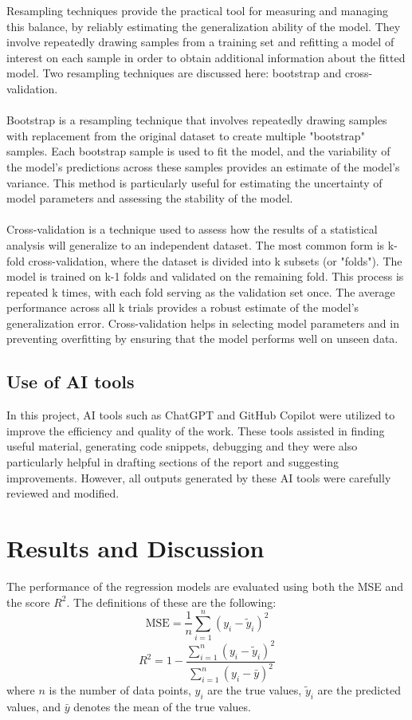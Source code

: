 \documentclass[
 reprint,            %
 amsmath,amssymb,
 aps,
]{revtex4-2}
\begin{document}
Resampling techniques provide the practical tool for measuring and managing this balance, by reliably estimating the generalization ability of the model.
They involve repeatedly drawing samples from a training set and refitting a model of interest on each sample in order to obtain additional information about the fitted model.
Two resampling techniques are discussed here: bootstrap and cross-validation.\\\\
Bootstrap is a resampling technique that involves repeatedly drawing samples with replacement from the original dataset to create multiple "bootstrap" samples\cite{hjorthjensen_week38}.
Each bootstrap sample is used to fit the model, and the variability of the model's predictions across these samples provides an estimate of the model's variance.
This method is particularly useful for estimating the uncertainty of model parameters and assessing the stability of the model.\\\\
Cross-validation is a technique used to assess how the results of a statistical analysis will generalize to an independent dataset\cite{hjorthjensen_week38}.
The most common form is k-fold cross-validation, where the dataset is divided into k subsets (or "folds").
The model is trained on k-1 folds and validated on the remaining fold.
This process is repeated k times, with each fold serving as the validation set once.
The average performance across all k trials provides a robust estimate of the model's generalization error.
Cross-validation helps in selecting model parameters and in preventing overfitting by ensuring that the model performs well on unseen data.

\subsection{Use of AI tools}
In this project, AI tools such as ChatGPT and GitHub Copilot were utilized to improve the efficiency and quality of the work. 
These tools assisted in finding useful material, generating code snippets, debugging and they were also particularly helpful in drafting sections of the report and suggesting improvements. 
However, all outputs generated by these AI tools were carefully reviewed and modified.


\section{Results and Discussion}
\label{sec:Results_and_Discussion}
The performance of the regression models are evaluated using both the MSE and the score $R^2$. The definitions of these are the following:
$$ \mathrm{MSE} = \frac{1}{n} \sum_{i=1}^{n} \left( y_i - \tilde{y}_i \right)^2$$
$$R^2 = 1 - \frac{\sum_{i=1}^{n} \left( y_i - \tilde{y}_i \right)^2}{\sum_{i=1}^{n} \left( y_i - \bar{y} \right)^2}$$
where $n$ is the number of data points, $y_i$ are the true values, $\tilde{y}_i$ are the predicted values, and $\bar{y}$ denotes the mean of the true values.
\end{document}
